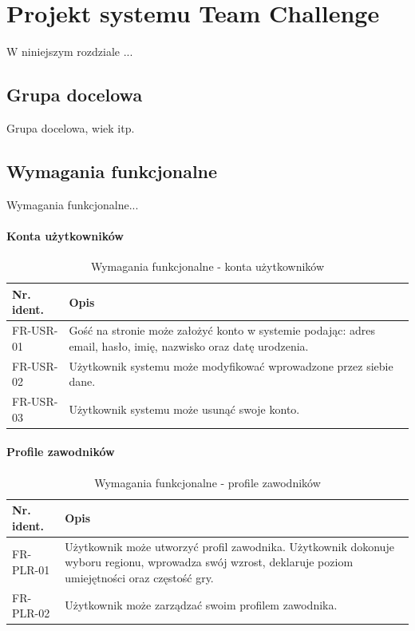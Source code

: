 \chapter{Projekt systemu Team Challenge}

W niniejszym rozdziale ...

\section{Grupa docelowa}

Grupa docelowa, wiek itp.

\section{Wymagania funkcjonalne}

Wymagania funkcjonalne...

\subsubsection{Konta użytkowników}


\begin{table}[H]
\centering\small
\caption{Wymagania funkcjonalne - konta użytkowników}
\label{tab:szablon}
\begin{tabularx}{\linewidth}{|p{.2\linewidth}|X|}\hline
Nr. ident. & Opis \\ \hline\hline

FR-USR-01 & Gość na stronie może założyć konto w systemie podając: adres email, hasło, imię, nazwisko oraz datę urodzenia. \\ \hline
FR-USR-02 & Użytkownik systemu może modyfikować wprowadzone przez siebie dane.  \\ \hline
FR-USR-03 & Użytkownik systemu może usunąć swoje konto.  \\ \hline

\end{tabularx}
\end{table}

\subsubsection{Profile zawodników}


\begin{table}[H]
\centering\small
\caption{Wymagania funkcjonalne - profile zawodników}
\label{tab:szablon}
\begin{tabularx}{\linewidth}{|p{.2\linewidth}|X|}\hline
Nr. ident. & Opis \\ \hline\hline

FR-PLR-01 & Użytkownik może utworzyć profil zawodnika. Użytkownik dokonuje wyboru regionu, wprowadza swój wzrost, deklaruje poziom umiejętności oraz częstość gry.   \\ \hline
FR-PLR-02 & Użytkownik może zarządzać swoim profilem zawodnika.  \\ \hline

\end{tabularx}
\end{table}

